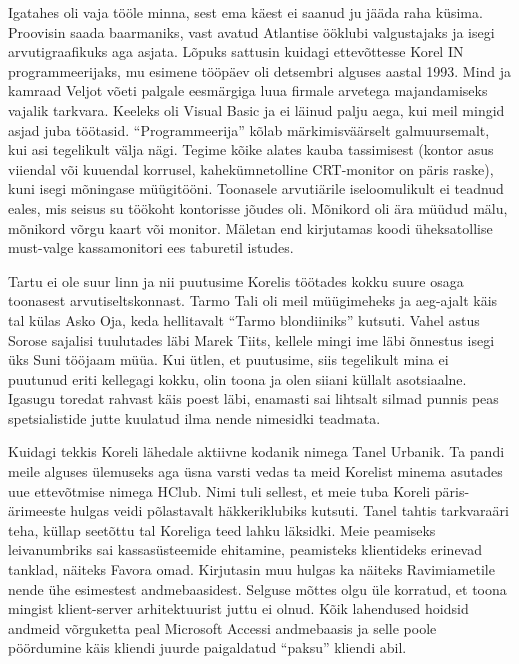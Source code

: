 Igatahes oli vaja tööle minna, sest ema käest ei saanud ju jääda raha küsima. Proovisin saada baarmaniks, vast avatud Atlantise ööklubi valgustajaks ja isegi arvutigraafikuks aga asjata. Lõpuks sattusin kuidagi ettevõttesse Korel IN programmeerijaks, mu esimene tööpäev oli detsembri alguses aastal 1993. Mind ja kamraad Veljot võeti palgale eesmärgiga luua firmale arvetega majandamiseks vajalik tarkvara. Keeleks oli Visual Basic ja ei läinud palju aega, kui meil mingid asjad juba töötasid. \enquote{Programmeerija} kõlab märkimisväärselt galmuursemalt, kui asi tegelikult välja nägi. Tegime kõike alates kauba tassimisest (kontor asus viiendal või kuuendal korrusel, kahekümnetolline CRT-monitor on päris raske), kuni isegi mõningase müügitööni. Toonasele arvutiärile iseloomulikult ei teadnud eales, mis seisus su töökoht kontorisse jõudes oli. Mõnikord oli ära müüdud mälu, mõnikord võrgu kaart või monitor. Mäletan end kirjutamas koodi üheksatollise must-valge kassamonitori ees taburetil istudes. 

Tartu ei ole suur linn ja nii puutusime Korelis töötades kokku suure osaga toonasest arvutiseltskonnast. Tarmo Tali oli meil müügimeheks ja aeg-ajalt käis tal külas Asko Oja, keda hellitavalt \enquote{Tarmo blondiiniks} kutsuti. Vahel astus Sorose sajalisi tuulutades läbi Marek Tiits, kellele mingi ime läbi õnnestus isegi üks Suni tööjaam müüa. Kui ütlen, et puutusime, siis tegelikult mina ei puutunud eriti kellegagi kokku, olin toona ja olen siiani küllalt asotsiaalne. Igasugu toredat rahvast käis poest läbi, enamasti sai lihtsalt silmad punnis peas spetsialistide jutte kuulatud ilma nende nimesidki teadmata. 

Kuidagi tekkis Koreli lähedale aktiivne kodanik nimega Tanel Urbanik. Ta pandi meile alguses ülemuseks aga üsna varsti vedas ta meid Korelist minema asutades uue ettevõtmise nimega HClub. Nimi tuli sellest, et meie tuba Koreli päris-ärimeeste hulgas veidi põlastavalt häkkeriklubiks kutsuti. Tanel tahtis tarkvaraäri teha, küllap seetõttu tal Koreliga teed lahku läksidki. Meie peamiseks leivanumbriks sai kassasüsteemide ehitamine, peamisteks klientideks erinevad tanklad, näiteks Favora omad. Kirjutasin muu hulgas ka näiteks Ravimiametile nende ühe esimestest andmebaasidest. Selguse mõttes olgu üle korratud, et toona mingist klient-server arhitektuurist juttu ei olnud. Kõik lahendused hoidsid andmeid võrguketta peal Microsoft Accessi andmebaasis ja selle poole pöördumine käis kliendi juurde paigaldatud \enquote{paksu} kliendi abil. 

